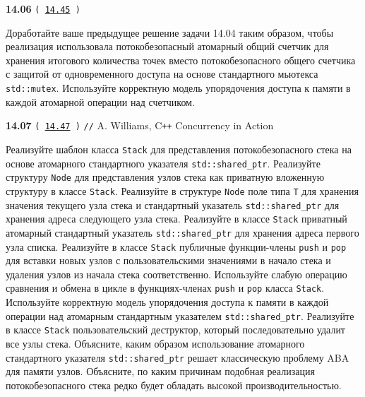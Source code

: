 \documentclass[a4paper,12pt]{article}
\begin{document}
\bigskip

{\large \textbf{14.06} \texttt{(\,\href{https://github.com/i-s-m-mipt/Education/blob/master/projects/examples/source/14.45.cpp}{14.45}\,)}}

\bigskip

Доработайте ваше предыдущее решение задачи 14.04 таким образом, чтобы реализация использовала потокобезопасный атомарный общий счетчик для хранения итогового количества точек вместо потокобезопасного общего счетчика с защитой от одновременного доступа на основе стандартного мьютекса \lstinline{std::mutex}. Используйте корректную модель упорядочения доступа к памяти в каждой атомарной операции над счетчиком.

\bigskip

{\large \textbf{14.07} \texttt{(\,\href{https://github.com/i-s-m-mipt/Education/blob/master/projects/examples/source/14.47.cpp}{14.47}\,)} \texttt{//} A. Williams, C\texttt{++} Concurrency in Action}

\bigskip

Реализуйте шаблон класса \lstinline{Stack} для представления потокобезопасного стека на основе атомарного стандартного указателя \lstinline{std::shared_ptr}. Реализуйте структуру \lstinline{Node} для представления узлов стека как приватную вложенную структуру в классе \lstinline{Stack}. Реализуйте в структуре \lstinline{Node} поле типа \lstinline{T} для хранения значения текущего узла стека и стандартный указатель \lstinline{std::shared_ptr} для хранения адреса следующего узла стека. Реализуйте в классе \lstinline{Stack} приватный атомарный стандартный указатель \lstinline{std::shared_ptr} для хранения адреса первого узла списка. Реализуйте в классе \lstinline{Stack} публичные функции-члены \lstinline{push} и \lstinline{pop} для вставки новых узлов с пользовательскими значениями в начало стека и удаления узлов из начала стека соответственно. Используйте слабую операцию сравнения и обмена в цикле в функциях-членах \lstinline{push} и \lstinline{pop} класса \lstinline{Stack}. Используйте корректную модель упорядочения доступа к памяти в каждой операции над атомарным стандартным указателем \lstinline{std::shared_ptr}. Реализуйте в классе \lstinline{Stack} пользовательский деструктор, который последовательно удалит все узлы стека. Объясните, каким образом использование атомарного стандартного указателя \lstinline{std::shared_ptr} решает классическую проблему ABA для памяти узлов. Объясните, по каким причинам подобная реализация потокобезопасного стека редко будет обладать высокой производительностью.
\end{document}
